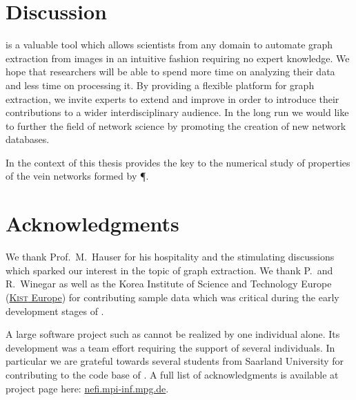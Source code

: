 \section{Discussion}

	\NEFI is a valuable tool which allows scientists from any domain to automate graph extraction from images in an intuitive fashion requiring no expert knowledge. We hope that researchers will be able to spend more time on analyzing their data and less time on processing it. By providing a flexible platform for graph extraction, we invite experts to extend and improve \NEFI in order to introduce their contributions to a wider interdisciplinary audience. In the long run we would like \NEFI to further the field of network science by promoting the creation of new network databases.

	In the context of this thesis \NEFI provides the key to the numerical study of properties of the vein networks formed by \P.

\section{Acknowledgments}

	We thank Prof.~M.~Hauser for his hospitality and the stimulating discussions which sparked our interest in the topic of graph extraction. We thank P.~and R.~Winegar as well as the Korea Institute of Science and Technology Europe (\href{www.kist-europe.de}{\textsc{Kist} Europe}) for contributing sample data which was critical during the early development stages of \NEFI.

	A large software project such as \NEFI cannot be realized by one individual alone. Its development was a team effort requiring the support of several individuals. In particular we are grateful towards several students from Saarland University for contributing to the code base of \NEFI. A full list of acknowledgments is available at \NEFIs project page here: \href{http://nefi.mpi-inf.mpg.de}{nefi.mpi-inf.mpg.de}.


